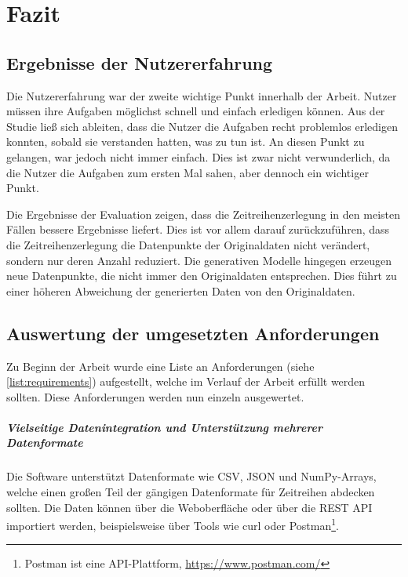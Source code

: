 
\chapter{Fazit}
\label{cha:conclusion}

\section{Ergebnisse der Nutzererfahrung}
\label{sec:results_of_user_experience}
Die Nutzererfahrung war der zweite wichtige Punkt innerhalb der Arbeit.
Nutzer müssen ihre Aufgaben möglichst schnell und einfach erledigen können.
Aus der Studie ließ sich ableiten, dass die Nutzer die Aufgaben recht problemlos erledigen konnten, sobald sie verstanden hatten, was zu tun ist.
An diesen Punkt zu gelangen, war jedoch nicht immer einfach. Dies ist zwar nicht verwunderlich, da die Nutzer die Aufgaben zum ersten Mal sahen, aber dennoch ein wichtiger Punkt.

Die Ergebnisse der Evaluation zeigen, dass die Zeitreihenzerlegung in den meisten Fällen bessere Ergebnisse liefert. Dies ist vor allem darauf zurückzuführen, 
dass die Zeitreihenzerlegung die Datenpunkte der Originaldaten nicht verändert, sondern nur deren Anzahl reduziert. Die generativen Modelle hingegen erzeugen neue Datenpunkte, die nicht 
immer den Originaldaten entsprechen. Dies führt zu einer höheren Abweichung der generierten Daten von den Originaldaten.

\section{Auswertung der umgesetzten Anforderungen}
Zu Beginn der Arbeit wurde eine Liste an Anforderungen (siehe \ref{list:requirements}) aufgestellt, welche im Verlauf der Arbeit erfüllt werden sollten. 
Diese Anforderungen werden nun einzeln ausgewertet.

\paragraph*{Vielseitige Datenintegration und Unterstützung mehrerer Datenformate}
Die Software unterstützt Datenformate wie CSV, JSON und NumPy-Arrays, welche einen großen Teil der gängigen Datenformate für Zeitreihen abdecken sollten.
Die Daten können über die Weboberfläche oder über die \ac{REST} \ac{API} importiert werden, beispielsweise über Tools wie curl oder Postman\footnote{Postman ist eine API-Plattform, \url{https://www.postman.com/}}.

